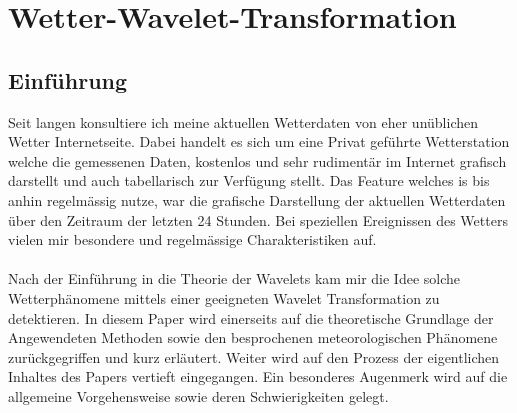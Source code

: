 %
%
%
\chapter{Wetter-Wavelet-Transformation\label{chapter:wwt}}
\begin{refsection}




\lstset{style=mystyle}


\section{Einführung}


Seit langen konsultiere ich meine aktuellen Wetterdaten von eher unüblichen Wetter Internetseite.
Dabei handelt es sich um eine Privat geführte Wetterstation welche die gemessenen Daten, kostenlos und sehr rudimentär im Internet grafisch darstellt und auch tabellarisch zur Verfügung stellt.
Das Feature welches is bis anhin regelmässig nutze, war die grafische Darstellung der aktuellen Wetterdaten über den Zeitraum der letzten 24 Stunden.
Bei speziellen Ereignissen des Wetters vielen mir besondere und regelmässige Charakteristiken auf.
\\
\\
Nach der Einführung in die Theorie der Wavelets kam mir die Idee solche Wetterphänomene mittels einer geeigneten Wavelet Transformation zu detektieren.
In diesem Paper wird einerseits auf die theoretische Grundlage der Angewendeten Methoden sowie den besprochenen meteorologischen Phänomene zurückgegriffen und kurz erläutert. 
Weiter wird auf den Prozess der eigentlichen Inhaltes des Papers vertieft eingegangen. Ein besonderes Augenmerk wird auf die allgemeine Vorgehensweise sowie deren Schwierigkeiten gelegt.
\\





\end{refsection}
